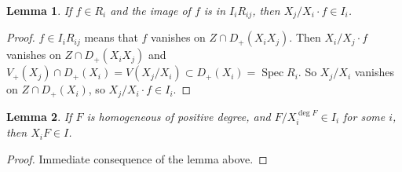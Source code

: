 \documentclass{article}
\DeclareMathOperator{\Spec}{Spec}
\theoremstyle{plain}
\newtheorem*{lem*}{Lemma}
\theoremstyle{definition}
\theoremstyle{remark}
\begin{document}
\begin{lem*}
If $f\in R_i$ and the image of $f$ is in $I_iR_{ij}$, then $X_j/X_i\cdot f\in I_i$.
\end{lem*}
\begin{proof}
$f\in I_iR_{ij}$ means that $f$ vanishes on $Z\cap D_+(X_iX_j)$. Then $X_i/X_j\cdot f$ vanishes on $Z\cap D_+(X_iX_j)$ and $V_+(X_j)\cap D_+(X_i)=V(X_j/X_i)\subset D_+(X_i)=\Spec R_i$. So $X_j/X_i$ vanishes on $Z\cap D_+(X_i)$, so $X_j/X_i\cdot f\in I_i$.
\end{proof}

\begin{lem*}
If $F$ is homogeneous of positive degree, and $F/X_i^{\deg F}\in I_i$ for some $i$, then $X_iF\in I$.
\end{lem*}
\begin{proof}
Immediate consequence of the lemma above.
\end{proof}
\end{document}
